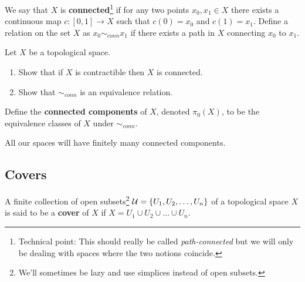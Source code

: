 	\begin{definition}
		We say that $X$ is \textbf{connected}\footnote{Technical point: This should really be called \emph{path-connected} but we will only be dealing with spaces where the two notions coincide.} if for any two points $ x_0,x_1 \in X$ there exists a continuous map $ c:[0,1] \rightarrow X$ such that $ c(0) = x_0$ and $ c(1) = x_1$. Define a relation on the set $X$ as $x_0 \sim_{conn} x_1$ if there exists a path in $X$ connecting $x_0$ to $x_1$.
	\end{definition}
	\begin{ques} Let $X$ be a topological space.
		\begin{enumerate}
			\item Show that if $ X$ is contractible then $ X$ is connected.
			\item Show that $\sim_{conn}$ is an equivalence relation.
		\end{enumerate}
	\end{ques}
	\begin{definition}
		Define the \textbf{connected components} of $X$, denoted $\pi_0(X)$, to be the equivalence classes of $X$ under $\sim_{conn}$.
	\end{definition}
	\begin{remark}
		All our spaces will have finitely many connected components.
	\end{remark}

\newpage
\subsection{Covers}
\begin{definition}
	A finite collection of open subsets\footnote{We'll sometimes be lazy and use simplices instead of open subsets.} $ \mathcal{U} = \{ U_1, U_2, \dots, U_n\}$ of a topological space $ X$ is said to be a \textbf{cover} of $ X$ if $X = U_1 \cup U_2 \cup \dots \cup U_n$.
\end{definition}

